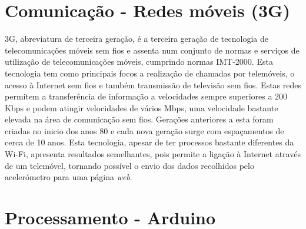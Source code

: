 \section{Comunicação - Redes móveis (3G)}
\label{sec:3g}

3G, abreviatura de terceira geração, é a terceira geração de tecnologia de telecomunicações móveis sem fios e assenta num conjunto de normas e serviços de utilização de telecomunicações móveis, cumprindo normas IMT-2000.
Esta tecnologia tem como principais focos a realização de chamadas por telemóveis, o acesso à Internet sem fios e também transmissão de televisão sem fios.
Estas redes permitem a transferência de informação a velocidades sempre superiores a 200 Kbps e podem atingir velocidades de vários Mbps, uma velocidade bastante elevada na área de comunicação sem fios.
Gerações anteriores a esta foram criadas no inicio dos anos 80 e cada nova geração surge com espaçamentos de cerca de 10 anos.
Esta tecnologia, apesar de ter processos bastante diferentes da Wi-Fi, apresenta resultados semelhantes, pois permite a ligação à Internet através de um telemóvel, tornando possível o envio dos dados recolhidos pelo acelerómetro para uma página \emph{web}.

\section{Processamento - Arduino}
\label{sec:arduino}

